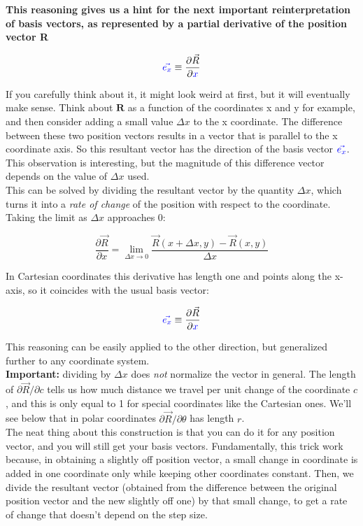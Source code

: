 \textbf{This reasoning gives us a hint for the next important reinterpretation of basis vectors, as represented by a 
partial derivative of the position vector R}

\begin{equation}
    \begingroup\color{blue}\vec{e_x}\endgroup \equiv \frac{\partial \vec{R}}{\partial \begingroup\color{blue}x\endgroup}
\end{equation}

If you carefully think about it, it might look weird at first, but it will eventually make sense.
Think about $\mathbf{R}$ as a function of the coordinates x and y for example, and then
consider adding a small value $\Delta x$ to the x coordinate. The difference between these two position
vectors results in a vector that is parallel to the x coordinate axis.
So this resultant vector has the direction of the basis vector $\color{blue}\vec{e_x}$. \\
This observation is interesting, but the magnitude of this difference vector depends on the
value of $\Delta x$ used. \\
This can be solved by dividing the resultant vector by the quantity $\Delta x$, which turns it into
a \textit{rate of change} of the position with respect to the coordinate. Taking the limit as $\Delta x$ approaches 0:

\begin{equation}
    \frac{\partial \vec{R}}{\partial x} = \lim_{\Delta x \to 0}\frac{\vec{R} (x + \Delta x, y) - \vec{R}(x,y)}{\Delta x}
\end{equation}

In Cartesian coordinates this derivative has length one and points along the x-axis, so it coincides with the
usual basis vector:

\begin{equation}
    \begingroup\color{blue}\vec{e_x}\endgroup \equiv \frac{\partial \vec{R}}{\partial \begingroup\color{blue}x\endgroup}
\end{equation}

This reasoning can be easily applied to the other direction, but generalized further
to any coordinate system.\\
\textbf{Important:} dividing by $\Delta x$ does \textit{not} normalize the vector in general. The length of
$\partial \vec{R}/\partial c$ tells us how much distance we travel per unit change of the coordinate $c$, and this
is only equal to 1 for special coordinates like the Cartesian ones. We'll see below that in polar coordinates
$\partial \vec{R}/\partial \theta$ has length $r$.\\
The neat thing about this construction is that you can do it for any position vector, and you 
will still get your basis vectors. Fundamentally, this trick work because, in obtaining a slightly 
off position vector, a small change in coordinate is added in one coordinate only while keeping other coordinates constant. 
Then, we divide the resultant vector (obtained from the difference between the original position vector and the new slightly off one)
by that small change, to get a rate of change that doesn't depend on the step size.\\\\

